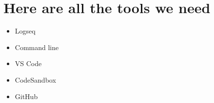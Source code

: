 \section{Here are all the tools we need}\label{sec:here-all-the-tools-we-need}

\begin{itemize}
    \item Logseq
    \item Command line
    \item VS Code
    \item CodeSandbox
    \item GitHub
\end{itemize}


